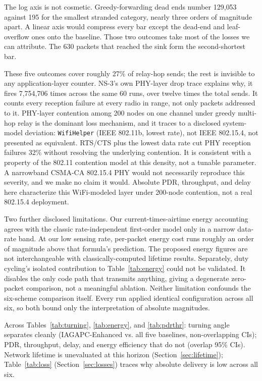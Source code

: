 \documentclass[runningheads]{llncs}
\begin{document}
The log axis is not cosmetic. Greedy-forwarding dead ends number 129{,}053
against 195 for the smallest stranded category, nearly three orders of
magnitude apart. A linear axis would compress every bar except the
dead-end and leaf-overflow ones onto the baseline. Those two outcomes take
most of the losses we can attribute. The 630 packets that reached the sink
form the second-shortest bar.

\sloppypar
These five outcomes cover roughly 27\% of relay-hop sends; the rest is
invisible to any application-layer counter. NS-3's own PHY-layer drop trace
explains why, it fires 7{,}754{,}706 times across the same 60 runs, over
twelve times the total sends. It counts every reception failure at every
radio in range, not only packets addressed to it. PHY-layer contention
among 200 nodes on one channel under greedy multi-hop relay is the
dominant loss mechanism, and it traces to a disclosed system-model
deviation: \texttt{WifiHelper} (IEEE 802.11b, lowest rate), not IEEE
802.15.4, not presented as equivalent. RTS/CTS plus the lowest data rate
cut PHY reception failures 32\% without resolving the underlying
contention. It is consistent with a property of the 802.11 contention
model at this density, not a tunable parameter. A narrowband CSMA-CA
802.15.4 PHY would not necessarily reproduce this severity, and we make no
claim it would. Absolute PDR, throughput, and delay here characterize this
WiFi-modeled layer under 200-node contention, not a real 802.15.4
deployment.

Two further disclosed limitations. Our current-times-airtime energy
accounting agrees with the classic rate-independent first-order model only
in a narrow data-rate band. At our low sensing rate, per-packet energy cost
runs roughly an order of magnitude above that formula's prediction. The proposed
energy figures are not interchangeable with classically-computed lifetime
results. Separately, duty cycling's isolated contribution to
Table~\ref{tab:energy} could not be validated. It disables the
only code path that transmits anything, giving a degenerate zero-packet
comparison, not a meaningful ablation. Neither limitation confounds the
six-scheme comparison itself. Every run applied identical configuration
across all six, so both bound only the interpretation of absolute
magnitudes.

Across Tables~\ref{tab:turning}, \ref{tab:energy}, and \ref{tab:pdrthr}:
turning angle separates cleanly (IAGAPC-Enhanced vs. all five baselines,
non-overlapping CIs); PDR, throughput, delay, and energy efficiency that do not
(overlap 95\% CIs). Network lifetime is unevaluated at this horizon
(Section~\ref{sec:lifetime}); Table~\ref{tab:loss} (Section~\ref{sec:losses})
traces why absolute delivery is low across all six.
\end{document}
